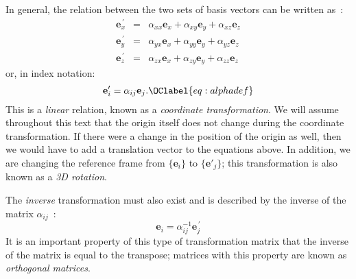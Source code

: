 In general, the relation between the two sets of basis vectors can be 
written as~:
\begin{eqnarray}
\mathbf{e}_x^{\,\prime}&=&\alpha_{xx}\mathbf{e}_x+\alpha_{xy}\mathbf{e}_y+\alpha_{xz}\mathbf{e}_z\nonumber\\
\mathbf{e}_y^{\,\prime}&=&\alpha_{yx}\mathbf{e}_x+\alpha_{yy}\mathbf{e}_y+\alpha_{yz}\mathbf{e}_z\\
\mathbf{e}_z^{\,\prime}&=&\alpha_{zx}\mathbf{e}_x+\alpha_{zy}\mathbf{e}_y+\alpha_{zz}\mathbf{e}_z\nonumber
\end{eqnarray}
or, in index notation:
\begin{equation}
	\mathbf{e}'_i = \alpha_{ij}\mathbf{e}_j.\OClabel{eq:alphadef}
\end{equation}
This is a \textit{linear} relation, known as a \textit{coordinate 
transformation}.  We will assume throughout this text that the 
origin itself does not change during the coordinate transformation.  
If there were a change in the position of the origin as well, then we 
would have to add a translation vector to the equations above.  
In addition, we are changing the reference frame from $\{\mathbf{e}_i\}$ to $\{\mathbf{e}'_j\}$; this 
transformation is also known as a \textit{3D rotation}.
 
The \textit{inverse} transformation must also exist and is described 
by the inverse of the matrix $\alpha_{ij}$~:
\begin{equation}
\mathbf{e}_i=\alpha^{-1}_{ij}\mathbf{e}_{j}^{\,\prime}
\end{equation}
It is an important property of this type of transformation matrix that the inverse of the matrix is
equal to the transpose; matrices with this property are known as \textit{orthogonal matrices}.

